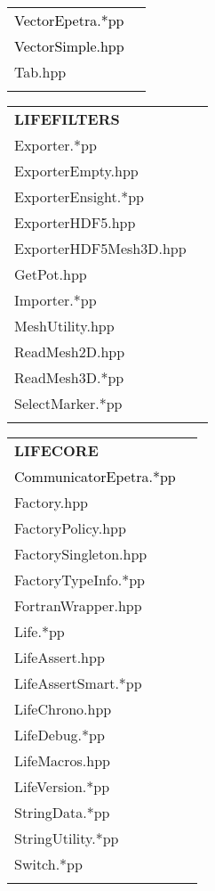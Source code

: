 \documentclass[10p]{article}
\newcommand{\newparts}[1]{\textcolor{black}{#1}}
\newcommand{\newpartsVC}[1]{\textcolor{black}{#1}}
\theoremstyle{definition}
\begin{document}
\begin{landscape}
\begin{table}[!h]
\begin{multicols}{4}
\begin{xtabular}{
p{0.20\textwidth}<{}
p{0.10\textwidth}<{}
}
\newparts{VectorEpetra.*pp} & \\
\newparts{VectorSimple.hpp} & \\
Tab.hpp &\\
& \\
\end{xtabular}
\begin{xtabular}{
p{0.20\textwidth}<{}
p{0.1\textwidth}<{}
}
\textbf{LIFEFILTERS} \\
Exporter.*pp & \\
ExporterEmpty.hpp & \\
ExporterEnsight.*pp & \\
ExporterHDF5.hpp & \\
ExporterHDF5Mesh3D.hpp & \\
GetPot.hpp & \\
Importer.*pp & \\
MeshUtility.hpp & \\
ReadMesh2D.hpp & \\
ReadMesh3D.*pp & \\
SelectMarker.*pp & \\
& \\
\end{xtabular}
\begin{xtabular}{
p{0.15\textwidth}<{}
p{0.1\textwidth}<{}
}
\textbf{LIFECORE} \\
\newpartsVC{CommunicatorEpetra.*pp} & \\
Factory.hpp & \\
FactoryPolicy.hpp & \\
FactorySingleton.hpp & \\
FactoryTypeInfo.*pp & \\
FortranWrapper.hpp & \\
Life.*pp & \\
LifeAssert.hpp & \\
LifeAssertSmart.*pp & \\
LifeChrono.hpp & \\
LifeDebug.*pp & \\
LifeMacros.hpp & \\
LifeVersion.*pp & \\
StringData.*pp & \\
StringUtility.*pp & \\
Switch.*pp & \\
& \\
\end{xtabular}


\end{multicols}
\end{table}
\end{landscape}
\end{document}
